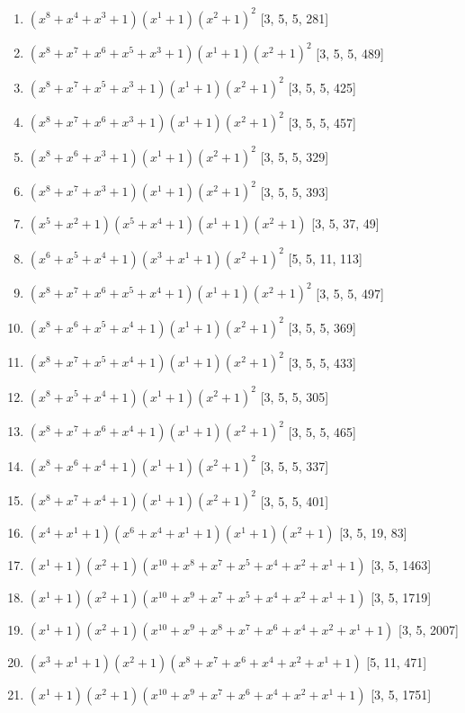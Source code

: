 \documentclass[10pt,twocolumn]{article}
\begin{document}
\begin{enumerate}
\item $(x^{8} + x^{4} + x^{3} + 1)(x^{1} + 1)(x^{2} + 1)^{2}$  [3, 5, 5, 281]
\item $(x^{8} + x^{7} + x^{6} + x^{5} + x^{3} + 1)(x^{1} + 1)(x^{2} + 1)^{2}$  [3, 5, 5, 489]
\item $(x^{8} + x^{7} + x^{5} + x^{3} + 1)(x^{1} + 1)(x^{2} + 1)^{2}$  [3, 5, 5, 425]
\item $(x^{8} + x^{7} + x^{6} + x^{3} + 1)(x^{1} + 1)(x^{2} + 1)^{2}$  [3, 5, 5, 457]
\item $(x^{8} + x^{6} + x^{3} + 1)(x^{1} + 1)(x^{2} + 1)^{2}$  [3, 5, 5, 329]
\item $(x^{8} + x^{7} + x^{3} + 1)(x^{1} + 1)(x^{2} + 1)^{2}$  [3, 5, 5, 393]
\item $(x^{5} + x^{2} + 1)(x^{5} + x^{4} + 1)(x^{1} + 1)(x^{2} + 1)$  [3, 5, 37, 49]
\item $(x^{6} + x^{5} + x^{4} + 1)(x^{3} + x^{1} + 1)(x^{2} + 1)^{2}$  [5, 5, 11, 113]
\item $(x^{8} + x^{7} + x^{6} + x^{5} + x^{4} + 1)(x^{1} + 1)(x^{2} + 1)^{2}$  [3, 5, 5, 497]
\item $(x^{8} + x^{6} + x^{5} + x^{4} + 1)(x^{1} + 1)(x^{2} + 1)^{2}$  [3, 5, 5, 369]
\item $(x^{8} + x^{7} + x^{5} + x^{4} + 1)(x^{1} + 1)(x^{2} + 1)^{2}$  [3, 5, 5, 433]
\item $(x^{8} + x^{5} + x^{4} + 1)(x^{1} + 1)(x^{2} + 1)^{2}$  [3, 5, 5, 305]
\item $(x^{8} + x^{7} + x^{6} + x^{4} + 1)(x^{1} + 1)(x^{2} + 1)^{2}$  [3, 5, 5, 465]
\item $(x^{8} + x^{6} + x^{4} + 1)(x^{1} + 1)(x^{2} + 1)^{2}$  [3, 5, 5, 337]
\item $(x^{8} + x^{7} + x^{4} + 1)(x^{1} + 1)(x^{2} + 1)^{2}$  [3, 5, 5, 401]
\item $(x^{4} + x^{1} + 1)(x^{6} + x^{4} + x^{1} + 1)(x^{1} + 1)(x^{2} + 1)$  [3, 5, 19, 83]
\item $(x^{1} + 1)(x^{2} + 1)(x^{10} + x^{8} + x^{7} + x^{5} + x^{4} + x^{2} + x^{1} + 1)$  [3, 5, 1463]
\item $(x^{1} + 1)(x^{2} + 1)(x^{10} + x^{9} + x^{7} + x^{5} + x^{4} + x^{2} + x^{1} + 1)$  [3, 5, 1719]
\item $(x^{1} + 1)(x^{2} + 1)(x^{10} + x^{9} + x^{8} + x^{7} + x^{6} + x^{4} + x^{2} + x^{1} + 1)$  [3, 5, 2007]
\item $(x^{3} + x^{1} + 1)(x^{2} + 1)(x^{8} + x^{7} + x^{6} + x^{4} + x^{2} + x^{1} + 1)$  [5, 11, 471]
\item $(x^{1} + 1)(x^{2} + 1)(x^{10} + x^{9} + x^{7} + x^{6} + x^{4} + x^{2} + x^{1} + 1)$  [3, 5, 1751]

\end{enumerate}
\end{document}
